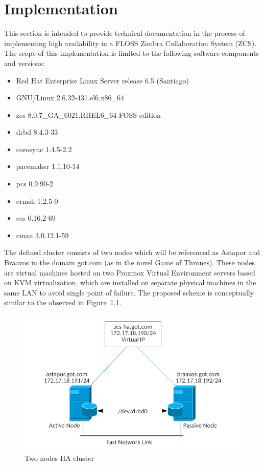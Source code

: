 \documentclass[a4paper, 12pt]{book}
\begin{document}
%
\chapter{Implementation}
\label{chap:implementation}

This section is intended to provide technical documentation in the process of implementing high availability in a FLOSS Zimbra Collaboration System (ZCS). The scope of this implementation is limited to the following software components and versions:
\begin{itemize}
	\setlength{\itemsep}{0pt}
	\item Red Hat Enterprise Linux Server release 6.5 (Santiago)
	\item GNU/Linux 2.6.32-431.el6.x86\_64
	\item zcs 8.0.7\_GA\_6021.RHEL6\_64 FOSS edition
	\item drbd 8.4.3-33
	\item corosync 1.4.5-2.2
	\item pacemaker 1.1.10-14
	\item pcs 0.9.90-2
	\item crmsh 1.2.5-0
	\item ccs 0.16.2-69
	\item cman 3.0.12.1-59
\end{itemize}

\noindent The defined cluster consists of two nodes which will be referenced as Astapor and Braavos in the domain got.com (as in the novel Game of Thrones). These nodes are virtual machines hosted on two Proxmox Virtual Environment servers based on KVM virtualization, which are installed on separate physical machines in the same LAN to avoid single point of failure. The proposed scheme is conceptually similar to the observed in Figure~\ref{fig:ha-cluster}.

\FloatBarrier
\begin{figure}[H]
  \centering
  \includegraphics[scale=0.50]{two_nodes_ha_cluster.png}
  \caption[Two nodes HA cluster]{Two nodes HA cluster}
  \label{fig:ha-cluster}
\end{figure}
\end{document}

